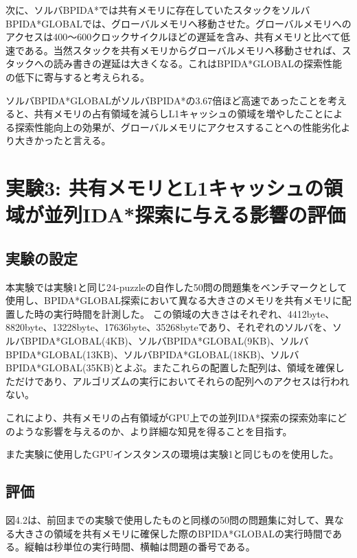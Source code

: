 \documentclass[a4paper,11pt,oneside,openany]{jsbook}
\begin{document}
次に、ソルバBPIDA*では共有メモリに存在していたスタックをソルバBPIDA*GLOBALでは、グローバルメモリへ移動させた。グローバルメモリへのアクセスは400～600クロックサイクルほどの遅延を含み、共有メモリと比べて低速である。当然スタックを共有メモリからグローバルメモリへ移動させれば、スタックへの読み書きの遅延は大きくなる。これはBPIDA*GLOBALの探索性能の低下に寄与すると考えられる。

ソルバBPIDA*GLOBALがソルバBPIDA*の3.67倍ほど高速であったことを考えると、共有メモリの占有領域を減らしL1キャッシュの領域を増やしたことによる探索性能向上の効果が、グローバルメモリにアクセスすることへの性能劣化より大きかったと言える。






\section{実験3: 共有メモリとL1キャッシュの領域が並列IDA*探索に与える影響の評価}


\subsection{実験の設定}
本実験では実験1と同じ24-puzzleの自作した50問の問題集をベンチマークとして使用し、BPIDA*GLOBAL探索において異なる大きさのメモリを共有メモリに配置した時の実行時間を計測した。
この領域の大きさはそれぞれ、4412byte、8820byte、13228byte、17636byte、35268byteであり、それぞれのソルバを、ソルバBPIDA*GLOBAL(4KB)、ソルバBPIDA*GLOBAL(9KB)、ソルバBPIDA*GLOBAL(13KB)、ソルバBPIDA*GLOBAL(18KB)、ソルバBPIDA*GLOBAL(35KB)とよぶ。またこれらの配置した配列は、領域を確保しただけであり、アルゴリズムの実行においてそれらの配列へのアクセスは行われない。

これにより、共有メモリの占有領域がGPU上での並列IDA*探索の探索効率にどのような影響を与えるのか、より詳細な知見を得ることを目指す。

また実験に使用したGPUインスタンスの環境は実験1と同じものを使用した。


\subsection{評価}
図4.2は、前回までの実験で使用したものと同様の50問の問題集に対して、異なる大きさの領域を共有メモリに確保した際のBPIDA*GLOBALの実行時間である。縦軸は秒単位の実行時間、横軸は問題の番号である。
\end{document}
